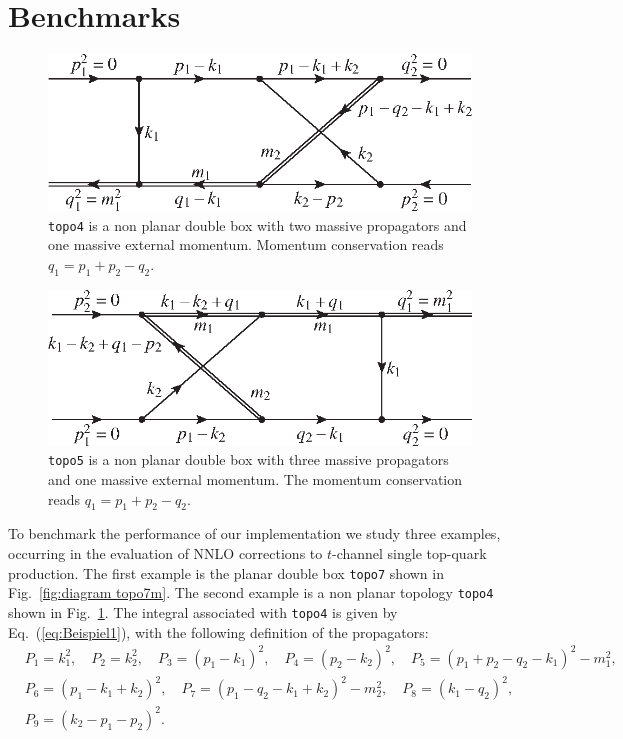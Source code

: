 \documentclass[a4paper,12pt]{scrartcl}
\def\Eq#1{{Eq.~(\ref{#1})}}
\def\Fig#1{{Fig.~\ref{#1}}}
\begin{document}
\section{Benchmarks}
\label{benchmark}
\begin{figure}[htpb]
\setlength{\abovecaptionskip}{-10pt plus 0pt minus 0pt}
  \begin{center}
    \includegraphics{./topo4}
  \end{center}
  \caption{\texttt{topo4} is a non planar double box with two massive
    propagators and one massive external momentum. Momentum
    conservation reads $q_{1}=p_{1}+p_{2}-q_{2}$.}
  \label{fig:diagram topo4}
\end{figure}

\begin{figure}[htpb]
\setlength{\abovecaptionskip}{-10pt plus 0pt minus 0pt}
  \begin{center}
    \includegraphics{./topo5}
  \end{center}
  \caption{\texttt{topo5} is a non planar double box with three massive
    propagators and one massive external momentum. The momentum
    conservation reads $q_{1}=p_{1}+p_{2}-q_{2}$.}
  \label{fig:diagram topo5}
\end{figure}

To benchmark the performance of our implementation we study three
examples, occurring in the evaluation of NNLO corrections to
$t$-channel single top-quark production.  The first example is the
planar double box \texttt{topo7} shown in \Fig{fig:diagram topo7m}.
The second example is a non planar topology \texttt{topo4} shown in
\Fig{fig:diagram topo4}. The integral associated with
\texttt{topo4} is given by \Eq{eq:Beispiel1}, with the following
definition of the propagators:
\begin{eqnarray*}
  &P_{1}=k_1^2, \quad
  P_{2}=k_2^2, \quad
  P_{3}=(p_{1}-k_{1})^2, \quad
  P_{4}=(p_{2}-k_{2})^2, \quad
  P_{5}=(p_{1}+p_{2}-q_{2}-k_{1})^2-m_1^2, \\
  &P_{6}=(p_{1}-k_{1}+k_{2})^2, \quad
  P_{7}=(p_{1}-q_{2}-k_{1}+k_{2})^2-m_2^2, \quad
  P_{8}=(k_{1}-q_{2})^2, \\
  &P_{9}=(k_{2}-p_{1}-p_{2})^2.
\end{eqnarray*}
\end{document}
